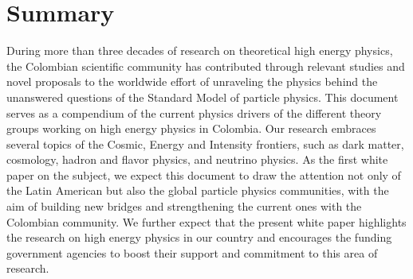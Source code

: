\documentclass[a4paper,11pt]{article}
\begin{document}
\section{Summary}
During more than three decades of research on theoretical high energy physics, the Colombian scientific community has contributed through relevant studies and novel proposals to the worldwide effort of unraveling the physics behind the unanswered questions of the Standard Model of particle physics.   
This document serves as a compendium of the current physics drivers of the different theory groups working on high energy physics in Colombia. 
Our research embraces several topics of the Cosmic, Energy and Intensity frontiers, such as dark matter, cosmology, hadron and flavor physics, and neutrino physics. 
As the first white paper on the subject, we expect this document to draw the attention not only of the Latin American but also the global particle physics communities, with the aim  of building new bridges and strengthening the current ones with the Colombian community. We further expect that the present white paper highlights the research on high energy physics in our country and encourages the funding government agencies to boost their support and commitment to this area of research.

 
\end{document}
